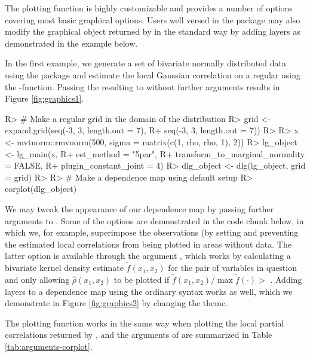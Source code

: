 The plotting function is highly customizable and provides a number of options covering most basic graphical options. Users well versed in the  package may also modify the graphical object returned by  in the standard way by adding layers as demonstrated in the example below.

In the first example, we generate a set of bivariate normally distributed data using the  package \citep{gentz:etal:2018} and estimate the local Gaussian correlation on a regular  using the -function. Passing the resulting  to  without further arguments results in Figure \ref{fig:graphics1}.

\begin{example}
R> # Make a regular grid in the domain of the distribution
R> grid <- expand.grid(seq(-3, 3, length.out = 7),
R+                     seq(-3, 3, length.out = 7))
R> 
R> x <- mvtnorm::rmvnorm(500, sigma = matrix(c(1, rho, rho, 1), 2))
R> lg_object <- lg_main(x, 
R+                      est_method = "5par", 
R+                      transform_to_marginal_normality = FALSE,
R+                      plugin_constant_joint = 4)
R> dlg_object <- dlg(lg_object, grid = grid)
R> 
R> # Make a dependence map using default setup
R> corplot(dlg_object)
\end{example}


We may tweak the appearance of our dependence map by passing further arguments to . Some of the options are demonstrated in the code chunk below, in which we, for example, superimpose the observations (by setting  and preventing the estimated local correlations from being plotted in areas without data. The latter option is available through the argument , which works by calculating a bivariate kernel density estimate \(\tilde f\left(x_1, x_2\right)\) for the pair of  variables in question and only allowing \(\widehat \rho\left(x_1,x_2\right)\) to be plotted if \(\tilde f\left(x_1,x_2\right)/\max\tilde f\left(\cdot\right) >\) . Adding layers to a dependence map using the ordinary  syntax works as well, which we demonstrate in Figure \ref{fig:graphics2} by changing the  theme.

The plotting function works in the same way when plotting the local partial correlations returned by , and the arguments of  are summarized in Table \ref{tab:arguments-corplot}.


